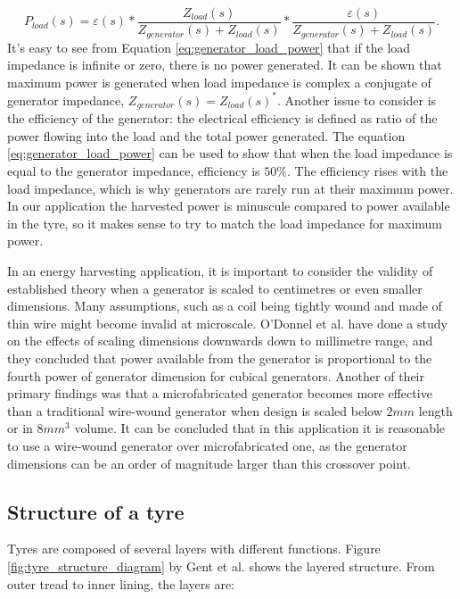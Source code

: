 \begin{equation} \label{eq:generator_load_power}
  P_{load}(s) = \varepsilon(s)*\frac{Z_{load}(s)}{Z_{generator}(s)+Z_{load}(s)}*\frac{\varepsilon(s)}{Z_{generator}(s)+Z_{load}(s)}.
\end{equation}
It's easy to see from Equation \eqref{eq:generator_load_power} that if the load impedance is infinite or zero, there is no power generated. It can be shown that maximum power is generated when load impedance is complex a conjugate of generator impedance, $Z_{generator}(s) = {Z_{load}(s)}^*$. Another issue to consider is the efficiency of the generator: the electrical efficiency is defined as ratio of the power flowing into the load and the total power generated. The equation \eqref{eq:generator_load_power} can be used to show that when the load impedance is equal to the generator impedance, efficiency is $ 50 \%$. The efficiency rises with the load impedance, which is why generators are rarely run at their maximum power. In our application the harvested power is minuscule compared to power available in the tyre, so it makes sense to try to match the load impedance for maximum power.

In an energy harvesting application, it is important to consider the validity of established theory when a generator is scaled to centimetres or even smaller dimensions. Many assumptions, such as a coil being tightly wound and made of thin wire might become invalid at microscale. O'Donnel et al. \cite{ODonnell2007} have done a study on the effects of scaling dimensions downwards down to millimetre range, and they concluded that power available from the generator is proportional to the fourth power of generator dimension for cubical generators. Another of their primary findings was that a microfabricated generator becomes more effective than a traditional wire-wound generator when design is scaled below $2 mm$ length or in $8 mm^3$ volume. It can be concluded that in this application it is reasonable to use a wire-wound generator over microfabricated one, as the generator dimensions can be an order of magnitude larger than this crossover point. 


\subsection{Structure of a tyre}

Tyres are composed of several layers with different functions. Figure \ref{fig:tyre_structure_diagram} by Gent et al. \cite{Gent2005} shows the layered structure. From outer tread to inner lining, the layers are: 

